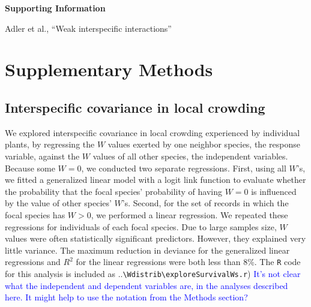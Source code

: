 \documentclass[11pt]{article}
\newcommand{\comment}{\textcolor{blue}}
\begin{document}

\clearpage 
\newpage 

\setcounter{page}{1}
\setcounter{equation}{0}
\setcounter{figure}{0}
\setcounter{section}{0}
\setcounter{table}{0}
\renewcommand{\theequation}{SI.\arabic{equation}}
\renewcommand{\thetable}{SI-\arabic{table}}
\renewcommand{\thefigure}{SI-\arabic{figure}}
\renewcommand{\thesection}{Section SI.\arabic{section}}

\centerline{\Large \textbf{Supporting Information }}
\centerline{Adler et al., ``Weak interspecific interactions''} 

\vspace{0.4in} 

\section{Supplementary Methods} \label{suppMethods}

\subsection{Interspecific covariance in local crowding} 
We explored interspecific covariance in local crowding experienced by individual plants, by regressing the $W$ values exerted by one neighbor species, the response variable, against the $W$ values of all other species, the independent variables. Because some $W=0$, we conducted two separate regressions. First, using all $W$'s, we fitted a generalized linear model with a logit link function to evaluate whether the probability that the focal species' probability of having $W=0$ is influenced by the value of other species' $W$'s. Second, for the set of records in which the focal species has $W>0$, we performed a linear regression. We repeated these regressions for individuals of each focal species. Due to large samples size, $W$ values were often statistically significant predictors. However, they explained very little variance. The maximum reduction in deviance for the generalized linear regressions and $R^2$ for the linear regressions were both less than 8\%. The \texttt{R} code for this analysis is included as ..\texttt{\textbackslash Wdistrib\textbackslash exploreSurvivalWs.r}) \comment{It's not clear what the independent and dependent variables are, in the analyses described
here. It might help to use the notation from the Methods section?} 
\end{document}
